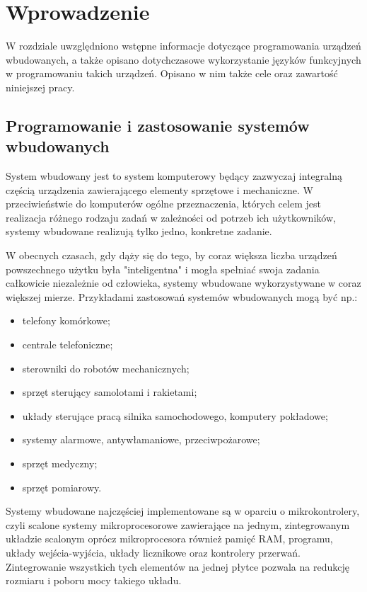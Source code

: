 \chapter{Wprowadzenie}
\label{cha:wprowadzenie}

W rozdziale uwzględniono wstępne informacje dotyczące programowania urządzeń wbudowanych, a także opisano dotychczasowe wykorzystanie języków funkcyjnych w programowaniu takich urządzeń.
Opisano w nim także cele oraz zawartość niniejszej pracy.


\section{Programowanie i zastosowanie systemów wbudowanych}
\label{sec:systemyWbudowane}

System wbudowany jest to system komputerowy będący zazwyczaj integralną częścią urządzenia zawierającego elementy sprzętowe i mechaniczne.
W przeciwieństwie do komputerów ogólne przeznaczenia, których celem jest realizacja różnego rodzaju zadań w zależności od potrzeb ich użytkowników, systemy wbudowane realizują tylko jedno, konkretne zadanie.

W obecnych czasach, gdy dąży się do tego, by coraz większa liczba urządzeń powszechnego użytku była "inteligentna" i mogła spełniać swoja zadania całkowicie niezależnie od człowieka, systemy wbudowane wykorzystywane w coraz większej mierze. Przykładami zastosowań systemów wbudowanych mogą być np.:
\begin{itemize}
\item telefony komórkowe;
\item centrale telefoniczne;
\item sterowniki do robotów mechanicznych;
\item sprzęt sterujący samolotami i rakietami;
\item układy sterujące pracą silnika samochodowego, komputery pokładowe;
\item systemy alarmowe, antywłamaniowe, przeciwpożarowe;
\item sprzęt medyczny;
\item sprzęt pomiarowy.
\end{itemize}

Systemy wbudowane najczęściej implementowane są w oparciu o mikrokontrolery, czyli scalone systemy mikroprocesorowe zawierające na jednym, zintegrowanym układzie scalonym oprócz mikroprocesora również pamięć RAM, programu, układy wejścia-wyjścia, układy licznikowe oraz kontrolery przerwań. Zintegrowanie wszystkich tych elementów na jednej płytce pozwala na redukcję rozmiaru i poboru mocy takiego układu.

